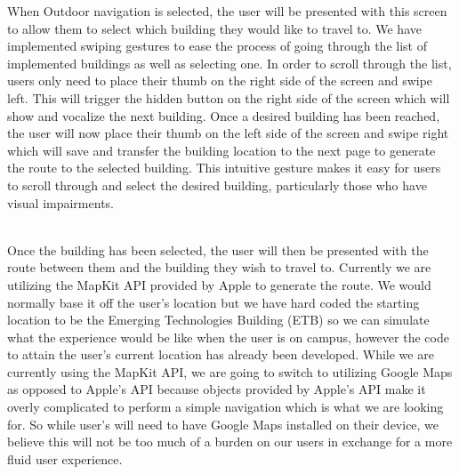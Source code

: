\documentclass[letterpaper,12pt]{article}
\begin{document}
    When Outdoor navigation is selected, the user will be presented with this screen to allow them to select which building they would like to travel to. We have implemented swiping gestures to ease the process of going through the list of implemented buildings as well as selecting one. In order to scroll through the list, users only need to place their thumb on the right side of the screen and swipe left. This will trigger the hidden button on the right side of the screen which will show and vocalize the next building. Once a desired building has been reached, the user will now place their thumb on the left side of the screen and swipe right which will save and transfer the building location to the next page to generate the route to the selected building. This intuitive gesture makes it easy for users to scroll through and select the desired building, particularly those who have visual impairments. 
    
    
 \\

    Once the building has been selected, the user will then be presented with the route between them and the building they wish to travel to. Currently we are utilizing the MapKit API provided by Apple to generate the route. We would normally base it off the user's location but we have hard coded the starting location to be the Emerging Technologies Building (ETB) so we can simulate what the experience would be like when the user is on campus, however the code to attain the user's current location has already been developed. While we are currently using the MapKit API, we are going to switch to utilizing Google Maps as opposed to Apple's API because objects provided by Apple's API make it overly complicated to perform a simple navigation which is what we are looking for. So while user's will need to have Google Maps installed on their device, we believe this will not be too much of a burden on our users in exchange for a more fluid user experience.
    
\end{document}
